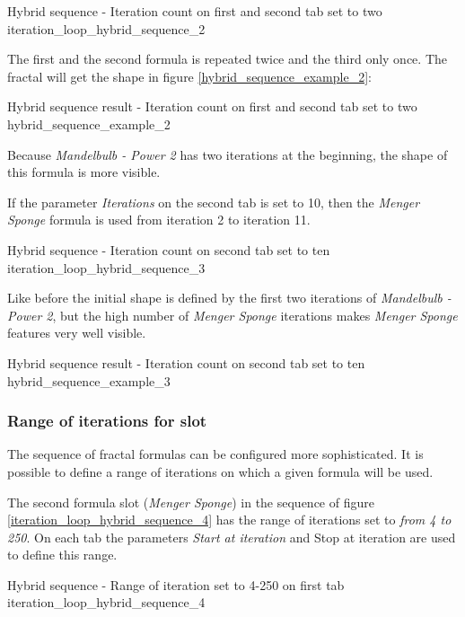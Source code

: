 {Hybrid sequence - Iteration count on first and second tab set to two}
{iteration_loop_hybrid_sequence_2}

The first and the second formula is repeated twice and the third only once.
The fractal will get the shape in figure \ref{hybrid_sequence_example_2}:

{Hybrid sequence result - Iteration count on first and second tab set to two}
{hybrid_sequence_example_2}

Because \emph{Mandelbulb - Power 2} has two iterations at the beginning, the shape of this formula is more visible.

If the parameter \emph{Iterations} on the second tab is set to 10,
then the \emph{Menger Sponge} formula is used from iteration 2 to iteration 11.

{Hybrid sequence - Iteration count on second tab set to ten}
{iteration_loop_hybrid_sequence_3}

Like before the initial shape is defined by the first two iterations of \emph{Mandelbulb - Power 2},
but the high number of \emph{Menger Sponge} iterations makes \emph{Menger Sponge} features very well visible.

{Hybrid sequence result - Iteration count on second tab set to ten}
{hybrid_sequence_example_3}

\subsubsection{Range of iterations for slot}

The sequence of fractal formulas can be configured more sophisticated.
It is possible to define a range of iterations on which a given formula will be used.

The second formula slot (\emph{Menger Sponge}) in the sequence of figure \ref{iteration_loop_hybrid_sequence_4} has the range of iterations set to \emph{from 4 to 250}.
On each tab the parameters \emph{Start at iteration} and {Stop at iteration} are used to define this range.

{Hybrid sequence - Range of iteration set to 4-250 on first tab}
{iteration_loop_hybrid_sequence_4}

